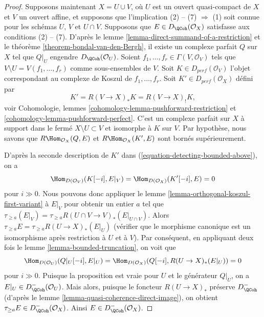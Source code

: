 \begin{proof}
\medskip\noindent
Supposons maintenant $X = U \cup V$, où $U$ est un ouvert quasi-compact de $X$ et
$V$ un ouvert affine, et supposons que l'implication (2) -- (7) $\Rightarrow$ (1)
soit connue pour les schémas $U$, $V$ et $U \cap V$.
Supposons que $E \in D_\QCoh(\mathcal{O}_X)$ satisfasse aux conditions (2) -- (7).
D'après le lemme \ref{lemma-direct-summand-of-a-restriction} et le
théorème \ref{theorem-bondal-van-den-Bergh}, il existe un complexe parfait
$Q$ sur $X$ tel que $Q|_U$ engendre $D_\QCoh (\mathcal{O}_U)$. 
Soient $f_1, \dots , f_r \in \Gamma (V, \mathcal{O}_V)$
tels que $V \setminus U = V(f_1, \dots , f_r)$ comme sous-ensembles de
$V$. Soit $K \in D_{perf}(\mathcal{O}_V)$ l'objet
correspondant au complexe de Koszul de $f_1, \dots , f_r$.
Soit $K' \in D_{perf}(\mathcal{O}_X)$ défini par
\begin{equation}
\label{equation-detecting-bounded-above}
K' = R (V \to X)_* K = R (V \to X)_! K,
\end{equation}
voir Cohomologie, lemmes \ref{cohomology-lemma-pushforward-restriction} et
\ref{cohomology-lemma-pushforward-perfect}. C'est un complexe parfait
sur $X$ à support dans le fermé $X \setminus U \subset V$
et isomorphe à $K$ sur $V$. Par hypothèse, nous savons que
$R\Hom_{\mathcal{O}_X}(Q, E)$ et
$R\Hom_{\mathcal{O}_X}(K', E)$ sont bornés supérieurement.

\medskip\noindent
D'après la seconde description de $K'$ dans (\ref{equation-detecting-bounded-above}),
on a
$$
\Hom_{D(\mathcal{O}_V)}(K[-i], E|_V) = \Hom_{D(\mathcal{O}_X)}(K'[-i], E) = 0
$$
pour $i \gg 0$. Nous pouvons donc appliquer le
lemme \ref{lemma-orthogonal-koszul-first-variant} à $E|_V$ pour
obtenir un entier $a$ tel que
$\tau_{\geq a}(E|_V) = \tau_{\geq a} R (U \cap V \to V)_* (E|_{U \cap V})$.
Alors $\tau_{\geq a} E = \tau_{\geq a} R (U \to X)_* (E |_U)$
(vérifier que le morphisme canonique est un isomorphisme après restriction à
$U$ et à $V$). Par conséquent, en appliquant deux fois le lemme \ref{lemma-bounded-truncation},
on voit que
$$
\Hom_{D(\mathcal{O}_U)}(Q|_U [-i], E|_U) =
\Hom_{D(\mathcal{O}_X)}(Q[-i], R (U \to X)_* (E|_U)) = 0
$$
pour $i \gg 0$. Puisque la proposition est vraie pour $U$ et le générateur
$Q|_U$, on a $E|_U \in D^-_\QCoh(\mathcal{O}_U)$. Mais alors, puisque
le foncteur $R (U \to X)_*$ préserve $D^-_\QCoh$ 
(d'après le lemme \ref{lemma-quasi-coherence-direct-image}), on obtient
$\tau_{\geq a}E \in D^-_\QCoh(\mathcal{O}_X)$. Ainsi 
$E \in D^-_\QCoh (\mathcal{O}_X)$. 
\end{proof}

